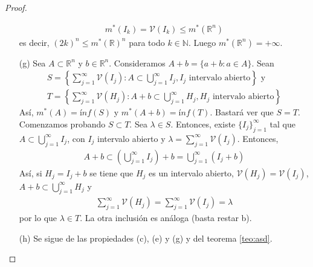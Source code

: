 \begin{proof}
\begin{enumerate}
    \begin{align*}
        m^*(I_k) = \mathcal{V}(I_k) \leq m^*(\mathbb{R}^n)
    \end{align*}
    es decir, $(2k)^n \leq m^*(\mathbb{R})^n$ para todo $k \in \mathbb{N}$. Luego $m^*(\mathbb{R}^n) = +\infty$.
    \item[(g)] Sea $A \subset \mathbb{R}^n$ y $b \in \mathbb{R}^n$. Consideramos $A + b = \{ a + b : a \in A\}$. Sean
    \begin{align*}
        S = \left\{  \sum_{j=1}^{\infty}{\mathcal{V}(I_j)} : A \subset \bigcup_{j=1}^{\infty}{I_j}, I_j \text{ intervalo abierto}\right\} \text{ y }\\
        T = \left\{  \sum_{j=1}^{\infty}{\mathcal{V}(H_j)} : A + b \subset \bigcup_{j=1}^{\infty}{H_j}, H_j \text{ intervalo abierto}\right\}
    \end{align*}
    Así, $m^*(A) = ínf(S)$ y $m^*(A + b) = ínf(T)$. Bastará ver que $S = T$.
    \newline
    Comenzamos probando $S \subset T$. Sea $\lambda \in S$. Entonces, existe $\{ I_j \}_{j=1}^{\infty}$ tal que $A \subset \bigcup_{j=1}^{\infty}{I_j}$, con $I_j$ intervalo abierto y $\lambda = \sum_{j=1}^{\infty}{\mathcal{V}(I_j)}$. Entonces,
    \begin{align*}
        A + b \subset \left( \bigcup_{j=1}^{\infty}{I_j} \right) + b =  \bigcup_{j=1}^{\infty}{(I_j + b)} 
    \end{align*}
    Así, si $H_j = I_j + b$ se tiene que $H_j$ es un intervalo abierto, $\mathcal{V}(H_j) = \mathcal{V}(I_j)$, $A + b \subset \bigcup_{j=1}^{\infty}{H_j}$ y
    \begin{align*}
        \sum_{j=1}^{\infty}{\mathcal{V}(H_j)} = \sum_{j=1}^{\infty}{\mathcal{V}(I_j)} = \lambda
    \end{align*}
    por lo que $\lambda \in T$. La otra inclusión es análoga (basta restar b).
    \item[(h)] Se sigue de las propiedades (c), (e) y (g) y del teorema \ref{teo:asd}.
\end{enumerate}
\end{proof}

